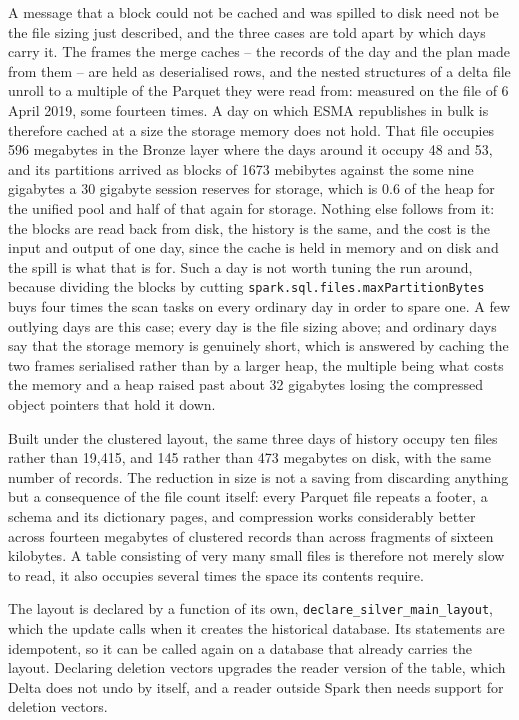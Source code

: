 A message that a block could not be cached and was spilled to disk need not be the file sizing just described, and the three cases are told apart by which days carry it. The frames the merge caches -- the records of the day and the plan made from them -- are held as deserialised rows, and the nested structures of a delta file unroll to a multiple of the Parquet they were read from: measured on the file of 6 April 2019, some fourteen times. A day on which ESMA republishes in bulk is therefore cached at a size the storage memory does not hold. That file occupies 596 megabytes in the Bronze layer where the days around it occupy 48 and 53, and its partitions arrived as blocks of 1673 mebibytes against the some nine gigabytes a 30 gigabyte session reserves for storage, which is 0.6 of the heap for the unified pool and half of that again for storage. Nothing else follows from it: the blocks are read back from disk, the history is the same, and the cost is the input and output of one day, since the cache is held in memory and on disk and the spill is what that is for. Such a day is not worth tuning the run around, because dividing the blocks by cutting \verb|spark.sql.files.maxPartitionBytes| buys four times the scan tasks on every ordinary day in order to spare one. A few outlying days are this case; every day is the file sizing above; and ordinary days say that the storage memory is genuinely short, which is answered by caching the two frames serialised rather than by a larger heap, the multiple being what costs the memory and a heap raised past about 32 gigabytes losing the compressed object pointers that hold it down.

Built under the clustered layout, the same three days of history occupy ten files rather than 19,415, and 145 rather than 473 megabytes on disk, with the same number of records. The reduction in size is not a saving from discarding anything but a consequence of the file count itself: every Parquet file repeats a footer, a schema and its dictionary pages, and compression works considerably better across fourteen megabytes of clustered records than across fragments of sixteen kilobytes. A table consisting of very many small files is therefore not merely slow to read, it also occupies several times the space its contents require.

The layout is declared by a function of its own, \verb|declare_silver_main_layout|, which the update calls when it creates the historical database. Its statements are idempotent, so it can be called again on a database that already carries the layout. Declaring deletion vectors upgrades the reader version of the table, which Delta does not undo by itself, and a reader outside Spark then needs support for deletion vectors.

